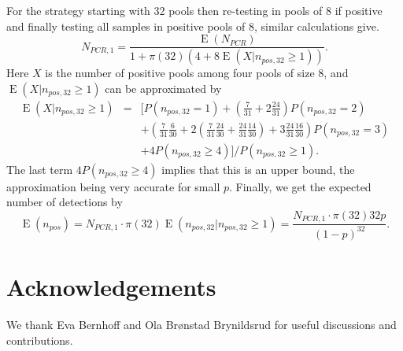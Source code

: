 \documentclass[10pt]{article}
\DeclareMathOperator{\E}{E}
\begin{document}
For the strategy starting with 32 pools then re-testing in pools of 8 if positive and finally testing all samples in positive pools of 8, similar calculations give. 
$$
N_{PCR,1}=\frac{\E(N_{PCR})}{1+\pi(32) (4+8 \E(X|n_{pos,32}\geq 1))}.  
$$
Here $X$ is the number of positive pools among four pools of size 8, and $\E(X|n_{pos,32}\geq 1)$ can be approximated by
\begin{eqnarray*}
\E(X|n_{pos,32}\geq 1) &=& [P(n_{pos,32}=1)+(\frac{7}{31}+2\frac{24}{31})P(n_{pos,32}=2)  \\
&& +(\frac{7}{31}\frac{6}{30}+2(\frac{7}{31}\frac{24}{30}+\frac{24}{31}\frac{14}{30})+3\frac{24}{31}\frac{16}{30})P(n_{pos,32}=3)\\
&& +4P(n_{pos,32}\geq 4) ]/P(n_{pos,32}\geq 1).
\end{eqnarray*}
The last term $4P(n_{pos,32}\geq 4)$ implies that this is an upper bound, the approximation being very accurate for small $p$. Finally, we get the expected number of detections by
$$
\E(n_{pos})=N_{PCR,1}\cdot\pi(32)\E(n_{pos,32}|n_{pos,32}\geq 1)=\frac{N_{PCR,1}\cdot \pi(32) 32 p}{(1-p)^{32}}.
$$  
\section*{Acknowledgements}
We thank Eva Bernhoff and Ola Brønstad Brynildsrud for useful discussions and contributions.
{}
\end{document}
